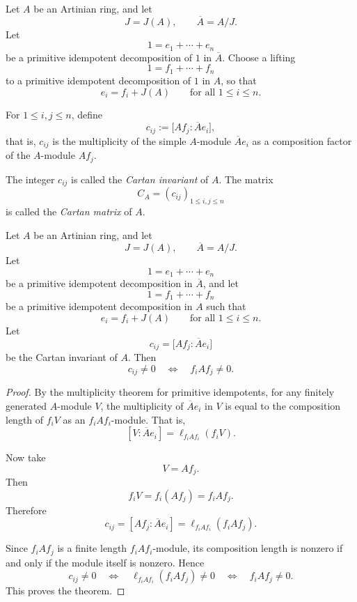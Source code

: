 \begin{definition}
    Let \(A\) be an Artinian ring, and let
    \[
        J=J(A), \qquad \overline{A}=A/J.
    \]
    Let
    \[
        1=e_1+\cdots+e_n
    \]
    be a primitive idempotent decomposition of \(1\) in \(\overline{A}\). Choose a lifting
    \[
        1=f_1+\cdots+f_n
    \]
    to a primitive idempotent decomposition of \(1\) in \(A\), so that
    \[
        e_i=f_i+J(A)
        \qquad
        \text{for all } 1\le i\le n.
    \]

    For \(1\le i,j\le n\), define
    \[
        c_{ij}:=\bigl[Af_j:\overline{A}e_i\bigr],
    \]
    that is, \(c_{ij}\) is the multiplicity of the simple \(A\)-module
    \(\overline{A}e_i\) as a composition factor of the \(A\)-module \(Af_j\).

    The integer \(c_{ij}\) is called the \emph{Cartan invariant} of \(A\). The matrix
    \[
        C_A=(c_{ij})_{1\le i,j\le n}
    \]
    is called the \emph{Cartan matrix} of \(A\).
\end{definition}

\begin{theorem}
    Let \(A\) be an Artinian ring, and let
    \[
        J=J(A), \qquad \overline{A}=A/J.
    \]
    Let
    \[
        1=e_1+\cdots+e_n
    \]
    be a primitive idempotent decomposition in \(\overline{A}\), and let
    \[
        1=f_1+\cdots+f_n
    \]
    be a primitive idempotent decomposition in \(A\) such that
    \[
        e_i=f_i+J(A)
        \qquad
        \text{for all } 1\le i\le n.
    \]
    Let
    \[
        c_{ij}=\bigl[Af_j:\overline{A}e_i\bigr]
    \]
    be the Cartan invariant of \(A\). Then
    \[
        c_{ij}\neq 0
        \quad\Longleftrightarrow\quad
        f_iAf_j\neq 0.
    \]
\end{theorem}

\begin{proof}
    By the multiplicity theorem for primitive idempotents, for any finitely generated
    \(A\)-module \(V\), the multiplicity of \(\overline{A}e_i\) in \(V\) is equal to the
    composition length of \(f_iV\) as an \(f_iAf_i\)-module. That is,
    \[
        [V:\overline{A}e_i]
        =
        \ell_{f_iAf_i}(f_iV).
    \]

    Now take
    \[
        V=Af_j.
    \]
    Then
    \[
        f_iV=f_i(Af_j)=f_iAf_j.
    \]
    Therefore
    \[
        c_{ij}
            =
            [Af_j:\overline{A}e_i]
        =
        \ell_{f_iAf_i}(f_iAf_j).
    \]

    Since \(f_iAf_j\) is a finite length \(f_iAf_i\)-module, its composition length is nonzero
    if and only if the module itself is nonzero. Hence
    \[
        c_{ij}\neq 0
        \quad\Longleftrightarrow\quad
        \ell_{f_iAf_i}(f_iAf_j)\neq 0
        \quad\Longleftrightarrow\quad
        f_iAf_j\neq 0.
    \]
    This proves the theorem.
\end{proof}

